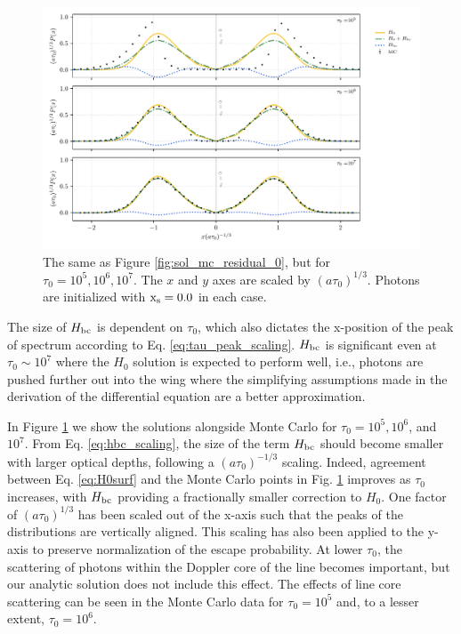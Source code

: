 \documentclass{aastex63}
\begin{document}
 \begin{figure}
    \centering
    \includegraphics{tau_threepanel.pdf}
    \caption{The same as Figure \ref{fig:sol_mc_residual_0}, but for $\tau_0 = 10^5, 10^6, 10^7$. The $x$ and $y$ axes are scaled by $(a\tau_0)^{1/3}$. Photons are initialized with $\rm x_s = 0.0$ in each case.} 
    \label{fig:sol_mc_tau}
\end{figure}

The size of $H_{\rm bc}$ is dependent on $\tau_0$, which also dictates the x-position of the peak of spectrum according to Eq. \ref{eq:tau_peak_scaling}. $H_{\rm bc}$ is significant even at $\tau_0 {\sim} 10^7$ where the $H_0$ solution is expected to perform well, i.e., photons are pushed further out into the wing where the simplifying assumptions made in the derivation of the differential equation are a better approximation. 

In Figure \ref{fig:sol_mc_tau} we show the solutions alongside Monte Carlo for $\tau_0=10^5, 10^6$, and $10^7$. From Eq. \ref{eq:hbc_scaling}, the size of the term $H_{\rm bc}$ should become smaller with larger optical depths, following a $(a\tau_0)^{-1/3}$ scaling. Indeed, agreement between Eq. \ref{eq:H0surf} and the Monte Carlo points in Fig. \ref{fig:sol_mc_tau} improves as $\tau_0$ increases, with $H_{\rm bc}$ providing a fractionally smaller correction to $H_0$. One factor of $(a\tau_0)^{1/3}$ has been scaled out of the x-axis such that the peaks of the distributions are vertically aligned. This scaling has also been applied to the y-axis to preserve normalization of the escape probability. At lower $\tau_0$, the scattering of photons within the Doppler core of the line becomes important, but our analytic solution does not include this effect. The effects of line core scattering can be seen in the Monte Carlo data for $\tau_0=10^5$ and, to a lesser extent, $
\tau_0=10^6$.
 
\end{document}
